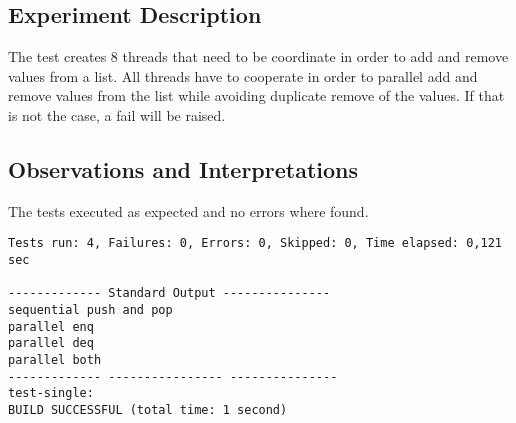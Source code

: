 \subsection{Experiment Description} 
\par
The test creates $8$ threads that need to be coordinate in order to add and remove values from a list. All threads have to cooperate in order to parallel add and remove values from the list while avoiding duplicate remove of the values.
If that is not the case, a fail will be raised.
\par



\subsection{Observations and Interpretations}

\par
The tests executed as expected and no errors where found. 
\begin{lstlisting}[frame=single,breaklines=true]
Tests run: 4, Failures: 0, Errors: 0, Skipped: 0, Time elapsed: 0,121 sec

------------- Standard Output ---------------
sequential push and pop
parallel enq
parallel deq
parallel both
------------- ---------------- ---------------
test-single:
BUILD SUCCESSFUL (total time: 1 second)
\end{lstlisting}




